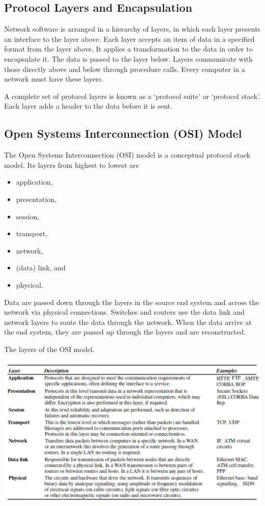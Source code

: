\subsection{Protocol Layers and Encapsulation}

Network software is arranged in a hierarchy of layers, in which each layer presents an interface to the layer above.
Each layer accepts an item of data in a specified format from the layer above.
It applies a transformation to the data in order to encapsulate it.
The data is passed to the layer below.
Layers communicate with those directly above and below through procedure calls.
Every computer in a network must have these layers.

A complete set of protocol layers is known as a `protocol suite' or `protocol stack'.
Each layer adds a header to the data before it is sent.

\subsection{Open Systems Interconnection (OSI) Model}

The Open Systems Interconnection (OSI) model is a conceptual protocol stack model.
Its layers from highest to lowest are
\begin{itemize}
  \item application,
  \item presentation,
  \item session,
  \item transport,
  \item network,
  \item (data) link, and
  \item physical.
\end{itemize}

Data are passed down through the layers in the source end system and across the network via physical connections.
Switches and routers use the data link and network layers to route the data through the network.
When the data arrive at the end system, they are passed up through the layers and are reconstructed.

\begin{table}[htp]
  \centering
  \caption*{The layers of the OSI model.}
  \includegraphics[width=15cm]{unit-16/figures/layer-summary.png}
\end{table}


